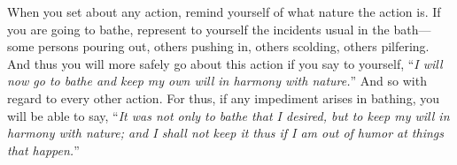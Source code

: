 When you set about any action, remind yourself of what nature the action
is. If you are going to bathe, represent to yourself the incidents usual
in the bath---some persons pouring out, others pushing in, others scolding,
others pilfering. And thus you will more safely go about this action if
you say to yourself, ``\emph{I will now go to bathe and keep my own will in
harmony with nature.}'' And so with regard to every other action. For thus,
if any impediment arises in bathing, you will be able to say, ``\emph{It was not
only to bathe that I desired, but to keep my will in harmony with nature;
and I shall not keep it thus if I am out of humor at things that happen.}''
